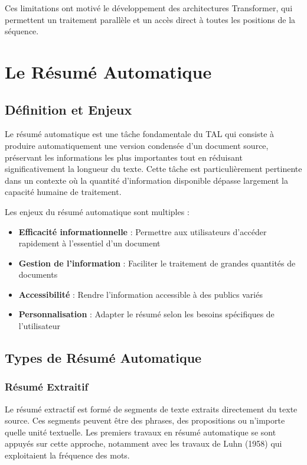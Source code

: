 Ces limitations ont motivé le développement des architectures Transformer, qui permettent un traitement parallèle et un accès direct à toutes les positions de la séquence.

\section{Le Résumé Automatique}

\subsection{Définition et Enjeux}

Le résumé automatique est une tâche fondamentale du TAL qui consiste à produire automatiquement une version condensée d'un document source, préservant les informations les plus importantes tout en réduisant significativement la longueur du texte. Cette tâche est particulièrement pertinente dans un contexte où la quantité d'information disponible dépasse largement la capacité humaine de traitement.

Les enjeux du résumé automatique sont multiples :
\begin{itemize}
    \item \textbf{Efficacité informationnelle} : Permettre aux utilisateurs d'accéder rapidement à l'essentiel d'un document
    \item \textbf{Gestion de l'information} : Faciliter le traitement de grandes quantités de documents
    \item \textbf{Accessibilité} : Rendre l'information accessible à des publics variés
    \item \textbf{Personnalisation} : Adapter le résumé selon les besoins spécifiques de l'utilisateur
\end{itemize}

\subsection{Types de Résumé Automatique}

\subsubsection{Résumé Extraitif}

Le résumé extractif est formé de segments de texte extraits directement du texte source. Ces segments peuvent être des phrases, des propositions ou n'importe quelle unité textuelle. Les premiers travaux en résumé automatique se sont appuyés sur cette approche, notamment avec les travaux de Luhn (1958) qui exploitaient la fréquence des mots.

